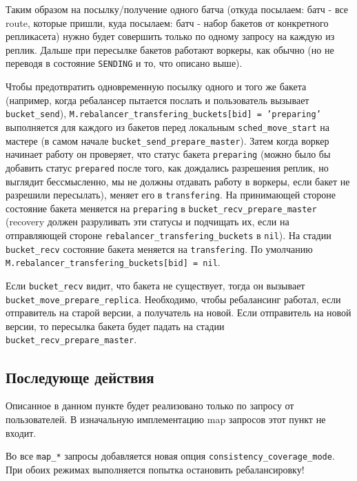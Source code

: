 Таким образом на посылку/получение одного батча (откуда посылаем: батч - все
route, которые пришли, куда посылаем: батч - набор бакетов от конкретного
репликасета) нужно будет совершить только по одному запросу на каждую из
реплик. Дальше при пересылке бакетов работают воркеры, как обычно (но не
переводя в состояние \texttt{SENDING} и то, что описано выше).

Чтобы предотвратить одновременную посылку одного и того же бакета (например,
когда ребалансер пытается послать и пользователь вызывает
\texttt{bucket_send}), \texttt{M.rebalancer_transfering_buckets[bid] =
'preparing'} выполняется для каждого из бакетов перед локальным
\texttt{sched_move_start} на мастере (в самом начале
\texttt{bucket_send_prepare_master}). Затем когда воркер начинает работу он
проверяет, что статус бакета \texttt{preparing} (можно было бы добавить статус
\texttt{prepared} после того, как дождались разрешения реплик, но выглядит
бессмысленно, мы не должны отдавать работу в воркеры, если бакет не разрешили
пересылать), меняет его в \texttt{transfering}. На принимающей стороне
состояние бакета меняется на \texttt{preparing} в
\texttt{bucket_recv_prepare_master} (recovery должен разруливать эти статусы и
подчищать их, если на отправляющей стороне
\texttt{rebalancer_transfering_buckets} в \texttt{nil}). На стадии
\texttt{bucket_recv} состояние бакета меняется на \texttt{transfering}. По
умолчанию \texttt{M.rebalancer_transfering_buckets[bid] = nil}.

Если \texttt{bucket_recv} видит, что бакета не существует, тогда он вызывает
\texttt{bucket_move_prepare_replica}. Необходимо, чтобы ребалансинг работал,
если отправитель на старой версии, а получатель на новой. Если отправитель на
новой версии, то пересылка бакета будет падать на стадии
\texttt{bucket_recv_prepare_master}.

\subsection{Последующе действия}

Описанное в данном пункте будет реализовано только по запросу от пользователей.
В изначальную имплементацию map запросов этот пункт не входит.

Во все \texttt{map\_*} запросы добавляется новая опция
\texttt{consistency\_coverage\_mode}. При обоих режимах выполняется попытка
остановить ребалансировку!

